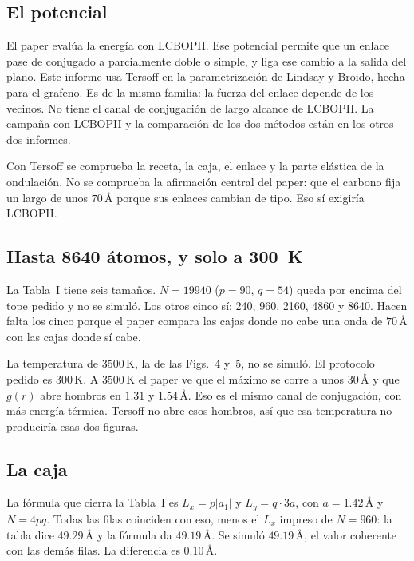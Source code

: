 \documentclass[11pt,a4paper]{article}
\begin{document}
\subsection{El potencial}

El paper evalúa la energía con LCBOPII.
Ese potencial permite que un enlace pase de conjugado a parcialmente doble o simple, y liga ese cambio a la salida del plano.
Este informe usa Tersoff en la parametrización de Lindsay y Broido, hecha para el grafeno.
Es de la misma familia: la fuerza del enlace depende de los vecinos.
No tiene el canal de conjugación de largo alcance de LCBOPII.
La campaña con LCBOPII y la comparación de los dos métodos están en los otros dos informes.

Con Tersoff se comprueba la receta, la caja, el enlace y la parte elástica de la ondulación.
No se comprueba la afirmación central del paper: que el carbono fija un largo de unos $70\,\text{\AA}$ porque sus enlaces cambian de tipo.
Eso sí exigiría LCBOPII.

\subsection{Hasta 8640 átomos, y solo a 300~K}

La Tabla~I tiene seis tamaños.
$N=19940$ ($p=90$, $q=54$) queda por encima del tope pedido y no se simuló.
Los otros cinco sí: 240, 960, 2160, 4860 y 8640.
Hacen falta los cinco porque el paper compara las cajas donde no cabe una onda de $70\,\text{\AA}$ con las cajas donde sí cabe.

La temperatura de $3500\,\mathrm{K}$, la de las Figs.~4 y~5, no se simuló.
El protocolo pedido es $300\,\mathrm{K}$.
A $3500\,\mathrm{K}$ el paper ve que el máximo se corre a unos $30\,\text{\AA}$ y que $g(r)$ abre hombros en $1.31$ y $1.54\,\text{\AA}$.
Eso es el mismo canal de conjugación, con más energía térmica.
Tersoff no abre esos hombros, así que esa temperatura no produciría esas dos figuras.

\subsection{La caja}

La fórmula que cierra la Tabla~I es $L_x=p|a_1|$ y $L_y=q\cdot 3a$, con $a=1.42\,\text{\AA}$ y $N=4pq$.
Todas las filas coinciden con eso, menos el $L_x$ impreso de $N=960$: la tabla dice $49.29\,\text{\AA}$ y la fórmula da $49.19\,\text{\AA}$.
Se simuló $49.19\,\text{\AA}$, el valor coherente con las demás filas.
La diferencia es $0.10\,\text{\AA}$.
\end{document}
